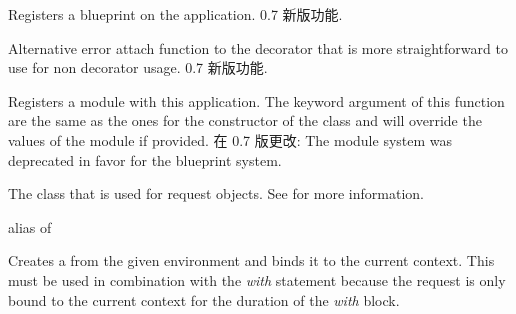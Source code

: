 \documentclass[a4paper,12pt]{sphinxmanual}
\begin{document}
\begin{fulllineitems}

\begin{fulllineitems}
\label{api:flask.Flask.register_blueprint}
Registers a blueprint on the application.
0.7 新版功能.
\end{fulllineitems}


\begin{fulllineitems}
\label{api:flask.Flask.register_error_handler}
Alternative error attach function to the {\hyperref[api:flask.Flask.errorhandler]{}}
decorator that is more straightforward to use for non decorator
usage.
0.7 新版功能.
\end{fulllineitems}


\begin{fulllineitems}
\label{api:flask.Flask.register_module}
Registers a module with this application.  The keyword argument
of this function are the same as the ones for the constructor of the
 class and will override the values of the module if
provided.
在 0.7 版更改: The module system was deprecated in favor for the blueprint
system.
\end{fulllineitems}


\begin{fulllineitems}
\label{api:flask.Flask.request_class}
The class that is used for request objects.  See {\hyperref[api:flask.Request]{}}
for more information.

alias of {\hyperref[api:flask.Request]{}}

\end{fulllineitems}


\begin{fulllineitems}
\label{api:flask.Flask.request_context}
Creates a {\hyperref[api:flask.ctx.RequestContext]{}} from the given
environment and binds it to the current context.  This must be used in
combination with the \emph{with} statement because the request is only bound
to the current context for the duration of the \emph{with} block.


\end{fulllineitems}
\end{fulllineitems}
\end{document}
